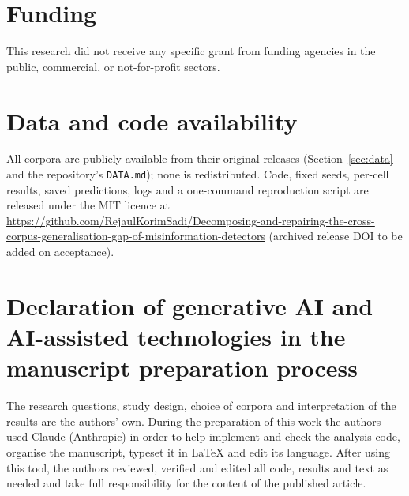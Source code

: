 \documentclass[review,3p,authoryear]{elsarticle}
\theoremstyle{definition}
\theoremstyle{plain}
\begin{document}
\section*{Funding}
This research did not receive any specific grant from funding agencies in the public, commercial, or not-for-profit sectors.

\section*{Data and code availability}
All corpora are publicly available from their original releases (Section~\ref{sec:data} and the repository's \texttt{DATA.md}); none is redistributed. Code, fixed seeds, per-cell results, saved predictions, logs and a one-command reproduction script are released under the MIT licence at \url{https://github.com/RejaulKorimSadi/Decomposing-and-repairing-the-cross-corpus-generalisation-gap-of-misinformation-detectors} (archived release DOI to be added on acceptance).

\section*{Declaration of generative AI and AI-assisted technologies in the manuscript preparation process}
The research questions, study design, choice of corpora and interpretation of the results are the authors' own. During the preparation of this work the authors used Claude (Anthropic) in order to help implement and check the analysis code, organise the manuscript, typeset it in LaTeX and edit its language. After using this tool, the authors reviewed, verified and edited all code, results and text as needed and take full responsibility for the content of the published article.




\appendix

\end{document}
